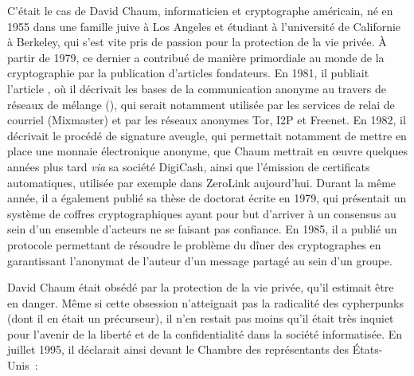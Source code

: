C'était le cas de David Chaum, informaticien et cryptographe américain, né en 1955 dans une famille juive à Los Angeles et étudiant à l'université de Californie à Berkeley, qui s'est vite pris de passion pour la protection de la vie privée. À partir de 1979, ce dernier a contribué de manière primordiale au monde de la cryptographie par la publication d'articles fondateurs. En 1981, il publiait l'article , où il décrivait les bases de la communication anonyme au travers de réseaux de mélange (), qui serait notamment utilisée par les services de relai de courriel (Mixmaster) et par les réseaux anonymes Tor, I2P et Freenet. En 1982, il décrivait le procédé de signature aveugle, qui permettait notamment de mettre en place une monnaie électronique anonyme, que Chaum mettrait en œuvre quelques années plus tard \emph{via} sa société DigiCash, ainsi que l'émission de certificats automatiques, utilisée par exemple dans ZeroLink aujourd'hui. Durant la même année, il a également publié sa thèse de doctorat écrite en 1979, qui présentait un système de coffres cryptographiques ayant pour but d'arriver à un consensus au sein d'un ensemble d'acteurs ne se faisant pas confiance. En 1985, il a publié un protocole permettant de résoudre le problème du dîner des cryptographes en garantissant l'anonymat de l'auteur d'un message partagé au sein d'un groupe. %

David Chaum était obsédé par la protection de la vie privée, qu'il estimait être en danger. Même si cette obsession n'atteignait pas la radicalité des cypherpunks (dont il en était un précurseur), il n'en restait pas moins qu'il était très inquiet pour l'avenir de la liberté et de la confidentialité dans la société informatisée. En juillet 1995, il déclarait ainsi devant le Chambre des représentants des États-Unis~:

